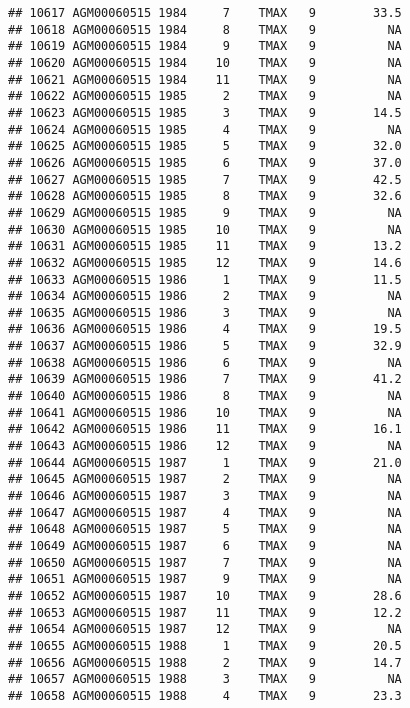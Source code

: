 \documentclass{article}\usepackage[]{graphicx}\usepackage[]{color}
\makeatletter
\newenvironment{kframe}{%
 \def\at@end@of@kframe{}%
 \ifinner\ifhmode%
  \def\at@end@of@kframe{\end{minipage}}%
  \begin{minipage}{\columnwidth}%
 \fi\fi%
 \def\FrameCommand##1{\hskip\@totalleftmargin \hskip-\fboxsep
 \colorbox{shadecolor}{##1}\hskip-\fboxsep
     \hskip-\linewidth \hskip-\@totalleftmargin \hskip\columnwidth}%
 \MakeFramed {\advance\hsize-\width
   \@totalleftmargin\z@ \linewidth\hsize
   \@setminipage}}%
 {\par\unskip\endMakeFramed%
 \at@end@of@kframe}
\newenvironment{knitrout}{}{} %
\makeatother
\begin{document}
\begin{knitrout}
\begin{kframe}
\begin{verbatim}
## 10617 AGM00060515 1984     7    TMAX   9        33.5
## 10618 AGM00060515 1984     8    TMAX   9          NA
## 10619 AGM00060515 1984     9    TMAX   9          NA
## 10620 AGM00060515 1984    10    TMAX   9          NA
## 10621 AGM00060515 1984    11    TMAX   9          NA
## 10622 AGM00060515 1985     2    TMAX   9          NA
## 10623 AGM00060515 1985     3    TMAX   9        14.5
## 10624 AGM00060515 1985     4    TMAX   9          NA
## 10625 AGM00060515 1985     5    TMAX   9        32.0
## 10626 AGM00060515 1985     6    TMAX   9        37.0
## 10627 AGM00060515 1985     7    TMAX   9        42.5
## 10628 AGM00060515 1985     8    TMAX   9        32.6
## 10629 AGM00060515 1985     9    TMAX   9          NA
## 10630 AGM00060515 1985    10    TMAX   9          NA
## 10631 AGM00060515 1985    11    TMAX   9        13.2
## 10632 AGM00060515 1985    12    TMAX   9        14.6
## 10633 AGM00060515 1986     1    TMAX   9        11.5
## 10634 AGM00060515 1986     2    TMAX   9          NA
## 10635 AGM00060515 1986     3    TMAX   9          NA
## 10636 AGM00060515 1986     4    TMAX   9        19.5
## 10637 AGM00060515 1986     5    TMAX   9        32.9
## 10638 AGM00060515 1986     6    TMAX   9          NA
## 10639 AGM00060515 1986     7    TMAX   9        41.2
## 10640 AGM00060515 1986     8    TMAX   9          NA
## 10641 AGM00060515 1986    10    TMAX   9          NA
## 10642 AGM00060515 1986    11    TMAX   9        16.1
## 10643 AGM00060515 1986    12    TMAX   9          NA
## 10644 AGM00060515 1987     1    TMAX   9        21.0
## 10645 AGM00060515 1987     2    TMAX   9          NA
## 10646 AGM00060515 1987     3    TMAX   9          NA
## 10647 AGM00060515 1987     4    TMAX   9          NA
## 10648 AGM00060515 1987     5    TMAX   9          NA
## 10649 AGM00060515 1987     6    TMAX   9          NA
## 10650 AGM00060515 1987     7    TMAX   9          NA
## 10651 AGM00060515 1987     9    TMAX   9          NA
## 10652 AGM00060515 1987    10    TMAX   9        28.6
## 10653 AGM00060515 1987    11    TMAX   9        12.2
## 10654 AGM00060515 1987    12    TMAX   9          NA
## 10655 AGM00060515 1988     1    TMAX   9        20.5
## 10656 AGM00060515 1988     2    TMAX   9        14.7
## 10657 AGM00060515 1988     3    TMAX   9          NA
## 10658 AGM00060515 1988     4    TMAX   9        23.3
## 10659 AGM00060515 1988     5    TMAX   9        33.7
## 10660 AGM00060515 1988     6    TMAX   9        32.6
## 10661 AGM00060515 1988     7    TMAX   9        42.2
## 10662 AGM00060515 1988     8    TMAX   9        40.3
## 10663 AGM00060515 1988     9    TMAX   9        30.2

\end{verbatim}
\end{kframe}
\end{knitrout}
\end{document}
